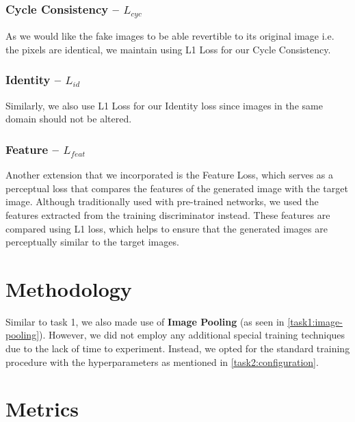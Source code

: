 \documentclass[twoside,english,notitlepage]{report}
\begin{document}
\subsubsection{Cycle Consistency – $L_{cyc}$}
As we would like the fake images to be able revertible to its original image i.e. the pixels are identical, we maintain using L1 Loss for our Cycle Consistency.

\subsubsection{Identity – $L_{id}$}
Similarly, we also use L1 Loss for our Identity loss since images in the same domain should not be altered. 
\subsubsection{Feature – $L_{feat}$}
Another extension that we incorporated is the Feature Loss, which serves as a perceptual loss that compares the features of the generated image with the target image. Although traditionally used with pre-trained networks, we used the features extracted from the training discriminator instead. These features are compared using L1 loss, which helps to ensure that the generated images are perceptually similar to the target images. 

\section{Methodology}
Similar to task 1, we also made use of \textbf{Image Pooling} (as seen in \ref{task1:image-pooling}). However, we did not employ any additional special training techniques due to the lack of time to experiment. Instead, we opted for the standard training procedure with the hyperparameters as mentioned in \ref{task2:configuration}.

\section{Metrics}\label{task2:metrics}
\end{document}
